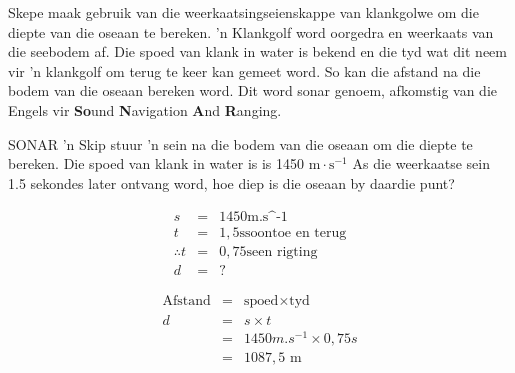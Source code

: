 \begin{minipage}{.5\textwidth}
\begin{figure}[H]
\begin{center}
\end{center}
\end{figure}       
\end{minipage}
\begin{minipage}{.5\textwidth}
Skepe maak gebruik van die weerkaatsingseienskappe van klankgolwe om die diepte van die oseaan te bereken. 'n Klankgolf word oorgedra en weerkaats van die seebodem af. Die spoed van klank in water is bekend en die tyd wat dit neem vir 'n klankgolf om terug te keer kan gemeet word. So kan die afstand na die bodem van die oseaan bereken word. Dit word sonar genoem, afkomstig van die Engels vir \textbf{So}und \textbf{N}avigation \textbf{A}nd \textbf{R}anging.\par    
 \end{minipage}
            

\begin{wex}{SONAR}{ 'n Skip stuur 'n sein na die bodem van die oseaan om die diepte te bereken. Die spoed van klank in water is is 1450 $\text{m}\cdot\text{s}^{-1}$ As die weerkaatse sein 1.5 sekondes later ontvang word, hoe diep is die oseaan by daardie punt?}{
\begin{eqnarray*}
s &=& 1450  \text{m.s^{-1}}\\
t &=& 1,5  \text{s}  \text{soontoe  en  terug}\\
\therefore t &= & 0,75 \text{s}  \text{een rigting}\\
d &=& ?
\end{eqnarray*}

\begin{eqnarray*}
\text{Afstand} &=& \text{spoed} \times \text{tyd} \\
d &=& s \times t \\
&=& 1450 m.s^{-1} \times 0,75 s \\
&=& 1087,5  \text{ m}
\end{eqnarray*}
}
\end{wex}
          
